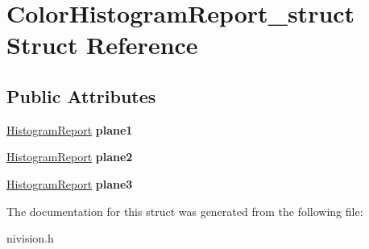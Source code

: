\hypertarget{structColorHistogramReport__struct}{\section{\-Color\-Histogram\-Report\-\_\-struct \-Struct \-Reference}
\label{structColorHistogramReport__struct}
}
\subsection*{\-Public \-Attributes}
\begin{DoxyCompactItemize}
\item 
\hypertarget{structColorHistogramReport__struct_a9447c5e30b66d562ebc5ad336de28499}{\hyperlink{structHistogramReport__struct}{\-Histogram\-Report} {\bfseries plane1}}\label{structColorHistogramReport__struct_a9447c5e30b66d562ebc5ad336de28499}

\item 
\hypertarget{structColorHistogramReport__struct_a3a361be59dd4ec47b0a9a5a65d59bf78}{\hyperlink{structHistogramReport__struct}{\-Histogram\-Report} {\bfseries plane2}}\label{structColorHistogramReport__struct_a3a361be59dd4ec47b0a9a5a65d59bf78}

\item 
\hypertarget{structColorHistogramReport__struct_af4cc0cf9d3c3cbc3603dc5609e73dfd0}{\hyperlink{structHistogramReport__struct}{\-Histogram\-Report} {\bfseries plane3}}\label{structColorHistogramReport__struct_af4cc0cf9d3c3cbc3603dc5609e73dfd0}

\end{DoxyCompactItemize}


\-The documentation for this struct was generated from the following file\-:\begin{DoxyCompactItemize}
\item 
nivision.\-h\end{DoxyCompactItemize}
